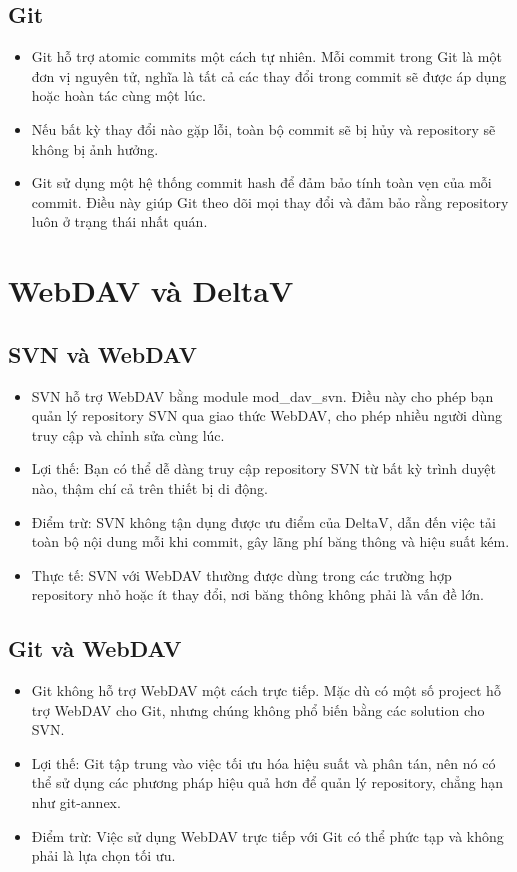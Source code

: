 \subsection{Git}
\begin{itemize}
    \item Git hỗ trợ atomic commits một cách tự nhiên. Mỗi commit trong Git là một đơn vị nguyên tử, nghĩa là tất cả các thay đổi trong commit sẽ được áp dụng hoặc hoàn tác cùng một lúc.
    \item Nếu bất kỳ thay đổi nào gặp lỗi, toàn bộ commit sẽ bị hủy và repository sẽ không bị ảnh hưởng.
    \item Git sử dụng một hệ thống commit hash để đảm bảo tính toàn vẹn của mỗi commit. Điều này giúp Git theo dõi mọi thay đổi và đảm bảo rằng repository luôn ở trạng thái nhất quán.
\end{itemize}

\section{WebDAV và DeltaV}
\subsection{SVN và WebDAV}
\begin{itemize}
    \item SVN hỗ trợ WebDAV bằng module mod_dav_svn. Điều này cho phép bạn quản lý repository SVN qua giao thức WebDAV, cho phép nhiều người dùng truy cập và chỉnh sửa cùng lúc.
    \item Lợi thế: Bạn có thể dễ dàng truy cập repository SVN từ bất kỳ trình duyệt nào, thậm chí cả trên thiết bị di động.
    \item Điểm trừ: SVN không tận dụng được ưu điểm của DeltaV, dẫn đến việc tải toàn bộ nội dung mỗi khi commit, gây lãng phí băng thông và hiệu suất kém.
    \item Thực tế: SVN với WebDAV thường được dùng trong các trường hợp repository nhỏ hoặc ít thay đổi, nơi băng thông không phải là vấn đề lớn.
\end{itemize}

\subsection{Git và WebDAV}
\begin{itemize}
    \item Git không hỗ trợ WebDAV một cách trực tiếp. Mặc dù có một số project hỗ trợ WebDAV cho Git, nhưng chúng không phổ biến bằng các solution cho SVN.
    \item Lợi thế: Git tập trung vào việc tối ưu hóa hiệu suất và phân tán, nên nó có thể sử dụng các phương pháp hiệu quả hơn để quản lý repository, chẳng hạn như git-annex.
    \item Điểm trừ: Việc sử dụng WebDAV trực tiếp với Git có thể phức tạp và không phải là lựa chọn tối ưu.
\end{itemize}

